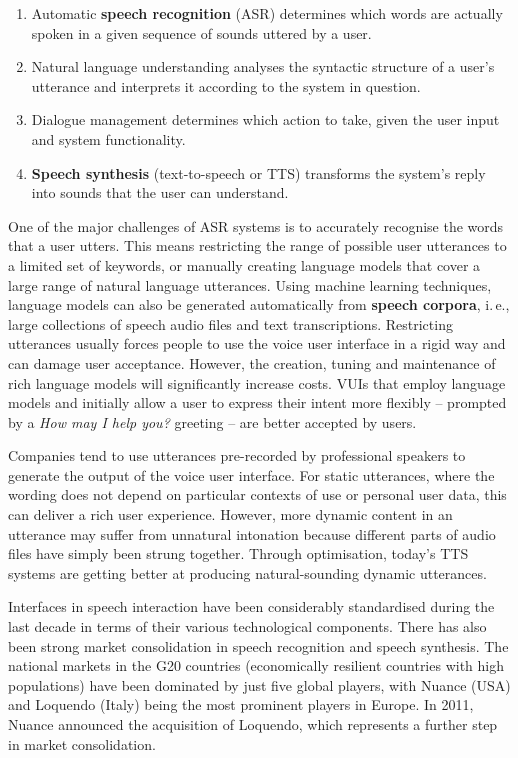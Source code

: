 \begin{multicols}{2}
\begin{enumerate}
\item Automatic \textbf{speech recognition} (ASR) determines which words are actually spoken in a given sequence of sounds uttered by a user.   
\item Natural language understanding analyses the syntactic structure of a user’s utterance and interprets it according to the system in question. 
\item Dialogue management determines which action to take, given the user input and system functionality.   
\item \textbf{Speech synthesis} (text-to-speech or TTS) transforms the system’s reply into sounds that the user can understand.
\end{enumerate}

One of the major challenges of ASR systems is to accurately recognise the words that a user utters. This means restricting the range of possible user utterances to a limited set of keywords, or manually creating language models that cover a large range of natural language utterances. Using machine learning techniques, language models can also be generated automatically from \textbf{speech corpora}, i.\,e., large collections of speech audio files and text transcriptions. Restricting utterances usually forces people to use the voice user interface in a rigid way and can damage user acceptance. However, the creation, tuning and maintenance of rich language models will significantly increase costs. VUIs that employ language models and initially allow a user to express their intent more flexibly -- prompted by a \textit{How may I help you?} greeting -- are better accepted by users.

Companies tend to use utterances pre-recorded by professional speakers to generate the output of the voice user interface. For static utterances, where the wording does not depend on particular contexts of use or personal user data, this can deliver a rich user experience. However, more dynamic content in an utterance may suffer from unnatural intonation because different parts of audio files have simply been strung together. Through optimisation, today’s TTS systems are getting better at producing natural-sounding dynamic utterances.


Interfaces in speech interaction have been considerably standardised during the last decade in terms of their various technological components. There has also been strong market consolidation in speech recognition and speech synthesis. The national markets in the G20 countries (economically resilient countries with high populations) have been dominated by just five global players, with Nuance (USA) and Loquendo (Italy) being the most prominent players in Europe. In 2011, Nuance announced the acquisition of Loquendo, which represents a further step in market consolidation.


\end{multicols}
